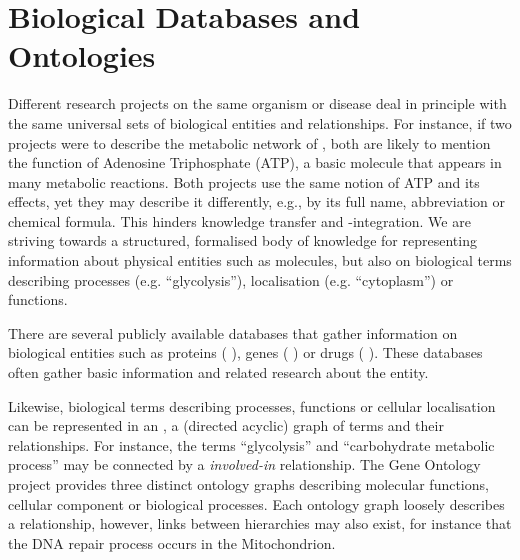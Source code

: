 \documentclass[
	fontsize=10pt, %
	twoside=false, %
	secnumdepth=1, %
  toc=indentunnumbered %
]{kaobook}
\begin{document}



\section{Biological Databases and Ontologies}
\label{sec:ontologies}



Different research projects on the same organism or disease deal in principle
with the same universal sets of biological entities and relationships. For
instance, if two projects were to describe the metabolic network of \ecoli, both
are likely to mention the function of Adenosine Triphosphate (ATP), a basic
molecule that appears in many metabolic reactions. Both projects use the same
notion of ATP and its effects, yet they may describe it differently, e.g., by
its full name, abbreviation or
chemical formula. This hinders knowledge transfer and -integration. We are
striving towards a structured, formalised body of knowledge for representing
information about physical entities such as molecules, but also on biological terms
describing processes (e.g. ``glycolysis''), localisation (e.g. ``cytoplasm'') or
functions.

There are several publicly available databases that gather information on
biological entities such as proteins (
\cite{theuniprotconsortium_UniProtUniversalProtein_2021}), genes
( \cite{maglott_EntrezGeneGenecentered_2005}) or drugs
( \cite{wishart_DrugBankKnowledgebaseDrugs_2008}). These
databases often gather basic information and related research about the entity.

Likewise, biological terms describing processes, functions or cellular
localisation can be represented in an , a (directed acyclic) graph
of terms and their relationships. For instance, the terms ``glycolysis'' and
``carbohydrate metabolic process'' may be connected by a \textit{involved-in}
relationship. The Gene Ontology project \cite{ashburner_GeneOntologyTool_2000}
provides three distinct ontology graphs describing molecular functions, cellular
component or biological processes. Each ontology graph loosely describes a
relationship, however, links between hierarchies may also exist, for instance
that the DNA repair process occurs in the Mitochondrion.
\end{document}
